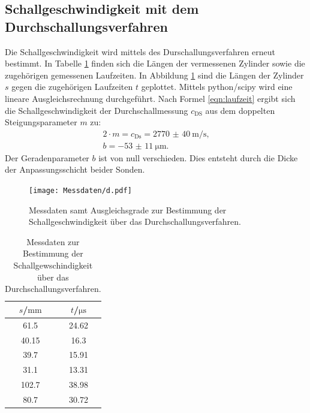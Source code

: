 \subsection{Schallgeschwindigkeit mit dem Durchschallungsverfahren}
Die Schallgeschwindigkeit wird mittels des Durschallungsverfahren erneut bestimmt.
In Tabelle \ref{tab:durchschall} finden sich die Längen der vermessenen Zylinder sowie die zugehörigen gemessenen Laufzeiten.
In Abbildung \ref{fig:durchschall} sind die Längen der Zylinder $s$ gegen die zugehörigen Laufzeiten $t$ geplottet. Mittels python/scipy \cite{scipy} wird eine lineare Ausgleichsrechnung durchgeführt.
Nach Formel \eqref{eqn:laufzeit} ergibt sich die Schallgeschwindigkeit der Durchschallmessung $c_\mathrm{DS}$ aus dem doppelten Steigungsparameter $m$ zu:
\begin{gather*}
  2\cdot m=c_\mathrm{Ds}=  \SI{2770(40)}{\meter\per\second}\text{,}\\
  b= \SI{-53(11)}{\micro\meter}\text{.}
\end{gather*}
Der Geradenparameter $b$ ist von null verschieden. Dies entsteht durch die Dicke der Anpassungsschicht beider Sonden.
\begin{figure}
  \centering
  \texttt{[image: Messdaten/d.pdf]}
  \caption{Messdaten samt Ausgleichsgrade zur Bestimmung der Schallgeschwindigkeit über das Durchschallungsverfahren.}
  \label{fig:durchschall}
\end{figure}
\begin{table}
  \centering
  \caption{Messdaten zur Bestimmung der Schallgewschindigkeit über das Durchschallungsverfahren.}
  \label{tab:durchschall}
\begin{tabular}{cc}
  \toprule
$s$/$\si{\milli\meter}$ & $t$/$\si{\micro\second}$ \\
\midrule
61.5 & 24.62 \\
40.15 & 16.3 \\
39.7 & 15.91 \\
31.1 & 13.31 \\
102.7 & 38.98 \\
80.7 & 30.72 \\
\bottomrule
\end{tabular}
\end{table}
\FloatBarrier
